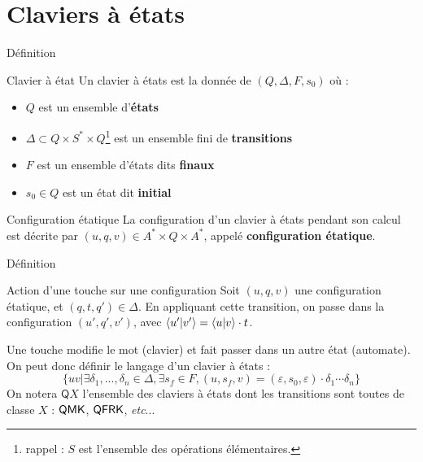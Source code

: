 \documentclass[11pt,french,professionalfonts]{beamer}
\begin{document}
\section{Claviers à états}
\begin{frame}{Définition}
	\begin{block}{Clavier à état}
		Un clavier à états est la donnée de $(Q,\Delta ,F,s_0)$ où :
        \begin{itemize}
            \item $Q$ est un ensemble d'\textbf{états}
            \item $\Delta \subset Q \times S^* \times Q$\footnote{rappel : $S$ est l'ensemble des opérations élémentaires.} est un ensemble fini de \textbf{transitions}
            \item $F$ est un ensemble d'états dits \textbf{finaux}
            \item $s_0 \in Q$ est un état dit \textbf{initial}
        \end{itemize}
	\end{block}
	\pause
	\begin{block}{Configuration étatique}
		La configuration d'un clavier à états pendant son calcul est décrite par $(u,q,v) \in A^* \times Q \times A^*$, appelé \textbf{configuration étatique}.
	\end{block}
\end{frame}
\begin{frame}{Définition}
	\begin{exampleblock}{Action d'une touche sur une configuration}	
		Soit $(u,q,v)$ une configuration étatique, et $(q,t,q') \in \Delta$. En appliquant cette transition, on passe dans la configuration $(u',q',v')$, avec $\left\langle u' \middle| v' \right\rangle = \left\langle u \middle| v \right\rangle \cdot t$.
	\end{exampleblock}
	Une touche modifie le mot (clavier) et fait passer dans un autre état (automate).
	\pause
    On peut donc définir le langage d'un clavier à états :
    \[ \{uv | \exists\delta_1,...,\delta_n \in \Delta, \exists s_f \in F, (u,s_f,v) = (\varepsilon,s_0,\varepsilon)\cdot\delta_1\cdots\delta_n \}\]
	\pause
    On notera $\mathsf{Q}X$ l'ensemble des claviers à états dont les transitions sont toutes de classe $X$ : $\mathsf{QMK}$, $\mathsf{QFRK}$, \textit{etc}... 
\end{frame}
\end{document}
